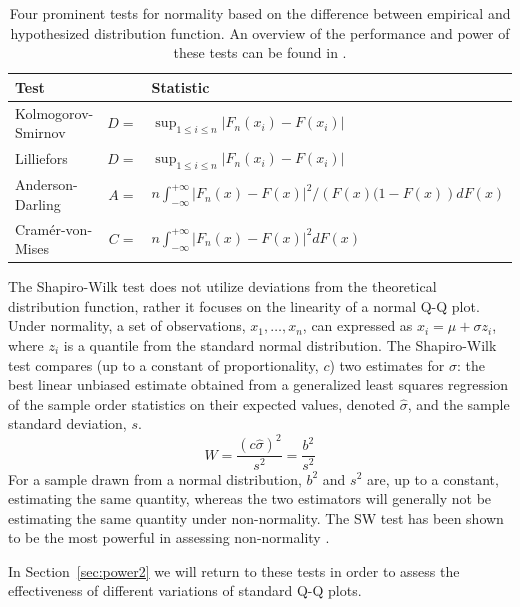 \documentclass{article}\usepackage[]{graphicx}\usepackage[]{color}
\begin{document}
\begin{table}
\centering
\caption{\label{tab:tests} Four prominent tests for normality based on the difference between empirical and hypothesized distribution function. An overview of the performance and power of these tests can be found in \citet{stephens:1974}.}
\begin{tabular}{lrl}\hline
Test && Statistic\\\hline\hline
Kolmogorov-Smirnov & $D =$ & $ \sup_{1 \le i \le n} \left | F_n(x_i) - F(x_i)\right|$ \\
Lilliefors & $D =$ & $ \sup_{1 \le i \le n} \left | F_n(x_i) - F(x_i)\right|$ \\
Anderson-Darling & $A =$ & $ n \int_{-\infty}^{+\infty} \left | F_n(x) - F(x)\right|^2/\left(F(x)(1 - F(x)\right) dF(x)$\\
Cram\'{e}r-von-Mises & $C =$ & $n \int_{-\infty}^{+\infty} \left | F_n(x) - F(x)\right|^2 dF(x)$ \\\hline
\end{tabular}
\end{table}
\afterpage{\clearpage}

%

The Shapiro-Wilk test \cite[SW-test,][]{Shapiro:1965kt} does not utilize deviations from the theoretical distribution function, rather it focuses on the linearity of a normal Q-Q plot. Under normality, a set of observations, $x_1, \ldots, x_n$, can expressed as $x_i = \mu + \sigma z_i$, where $z_i$ is a quantile from the standard normal distribution. The Shapiro-Wilk test compares (up to a constant of proportionality, $c$) two estimates for $\sigma$: the best linear unbiased estimate obtained from a generalized least squares regression of the sample order statistics on their expected values, denoted $\widehat{\sigma}$, and the sample standard deviation, $s$.
\[
  W = \frac{(c \widehat{\sigma})^2}{s^2} = \frac{b^2}{s^2}
\]
For a sample drawn from a normal distribution, $b^2$ and $s^2$ are, up to a constant, estimating the same quantity, whereas the two estimators will generally not be estimating the same quantity under non-normality. The SW test has been shown to be the most powerful in assessing non-normality \citep{stephens:1974, razali:2011}.

In Section~\ref{sec:power2} we will return to these tests in order to assess the effectiveness of different variations of standard Q-Q plots.
\end{document}
